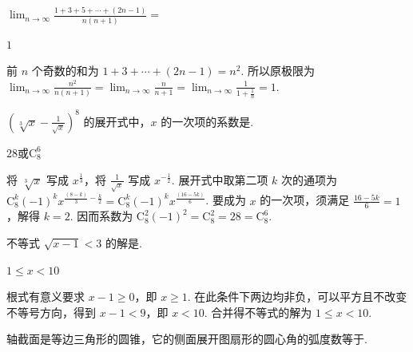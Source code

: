 \documentclass[UTF8,a4paper,oneside,11pt]{ctexbook}
\begin{document}
\begin{problem}

\(\displaystyle\lim_{n\to \infty}\frac{1 + 3 + 5 + \cdots + (2n - 1)}{n(n + 1)} =\)\fillinblank{}
\end{problem}

\begin{answer}
\(1\)
\end{answer}

\begin{solution}
前 \(n\) 个奇数的和为 \(1+3+\cdots+(2n-1)=n^2\). 所以原极限为 \(\displaystyle\lim_{n\to\infty}\frac{n^2}{n(n+1)}=\lim_{n\to\infty}\frac{n}{n+1}=\lim_{n\to\infty}\frac{1}{1+\frac1n}=1\).
\end{solution}

\begin{problem}

\(\left( \sqrt[3]{x}-\frac{1}{\sqrt{x}} \right)^8\) 的展开式中，\(x\) 的一次项的系数是\fillinblank{}.
\end{problem}

\begin{answer}
\(28\)或\(\mathrm C_8^6\)
\end{answer}

\begin{solution}
将 \(\sqrt[3]{x}\) 写成 \(x^{\frac{1}{3}}\)，将 \(\frac1{\sqrt{x}}\) 写成 \(x^{-\frac{1}{2}}\). 展开式中取第二项 \(k\) 次的通项为 \(\mathrm C_8^k(-1)^k x^{\frac{(8-k)}{3}-\frac{k}{2}}=\mathrm C_8^k(-1)^k x^{\frac{(16-5k)}{6}}\). 要成为 \(x\) 的一次项，须满足 \(\frac{16-5k}{6}=1\)，解得 \(k=2\). 因而系数为 \(\mathrm C_8^2(-1)^2=\mathrm C_8^2=28=\mathrm C_8^6\).
\end{solution}

\begin{problem}

不等式 \(\sqrt{x - 1} < 3\) 的解是\fillinblank{}.
\end{problem}

\begin{answer}
\(1\leqslant x<10\)
\end{answer}

\begin{solution}
根式有意义要求 \(x-1\geqslant0\)，即 \(x\geqslant1\). 在此条件下两边均非负，可以平方且不改变不等号方向，得到 \(x-1<9\)，即 \(x<10\). 合并得不等式的解为 \(1\leqslant x<10\).
\end{solution}

\begin{problem}

轴截面是等边三角形的圆锥，它的侧面展开图扇形的圆心角的弧度数等于\fillinblank{}.
\end{problem}
\end{document}
